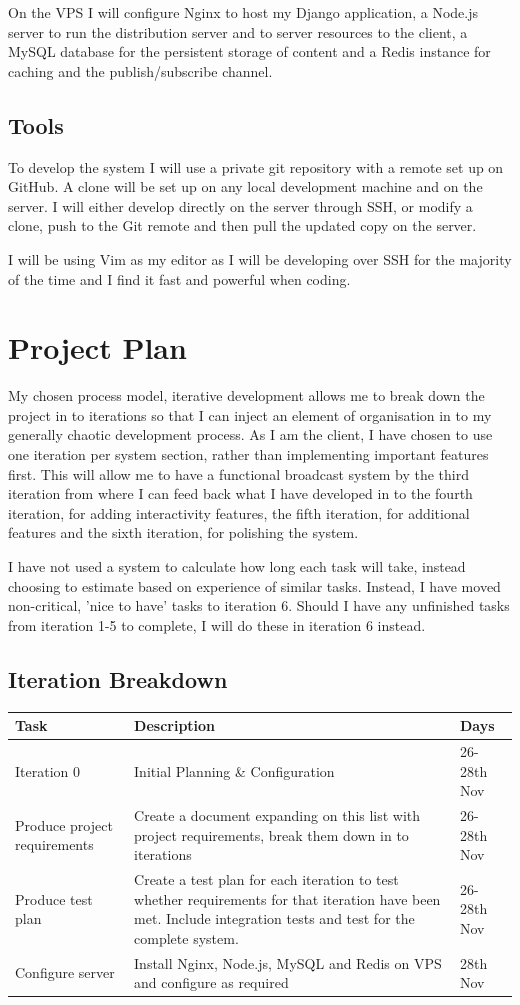 \documentclass[a4papert,11pt,notitlepage]{ltxdoc}
\begin{document}
On the VPS I will configure Nginx to host my Django application, a Node.js server to run the distribution server and to server resources to the client, a MySQL database for the persistent storage of content and a Redis instance for caching and the publish/subscribe channel.

\subsection{Tools}
To develop the system I will use a private git repository with a remote set up on GitHub. A clone will be set up on any local development machine and on the server. I will either develop directly on the server through SSH, or modify a clone, push to the Git remote and then pull the updated copy on the server.

I will be using Vim as my editor as I will be developing over SSH for the majority of the time and I find it fast and powerful when coding.

\section{Project Plan}
My chosen process model, iterative development allows me to break down the project in to iterations so that I can inject an element of organisation in to my generally chaotic development process. As I am the client, I have chosen to use one iteration per system section, rather than implementing important features first. This will allow me to have a functional broadcast system by the third iteration from where I can feed back what I have developed in to the fourth iteration, for adding interactivity features, the fifth iteration, for additional features and the sixth iteration, for polishing the system.

I have not used a system to calculate how long each task will take, instead choosing to estimate based on experience of similar tasks. Instead, I have moved non-critical, 'nice to have' tasks to iteration 6. Should I have any unfinished tasks from iteration 1-5 to complete, I will do these in iteration 6 instead.
 
\subsection{Iteration Breakdown}
\begin{tabular}{p{5cm} p{7cm} p{4cm}}
Task & Description & Days \\
\hline
Iteration 0 & Initial Planning \& Configuration & 26-28th Nov \\
\hline
Produce project requirements & Create a document expanding on this list with project requirements, break them down in to iterations & 26-28th Nov  \\
Produce test plan & Create a test plan for each iteration to test whether requirements for that iteration have been met. Include integration tests and test for the complete system. & 26-28th Nov \\
Configure server & Install Nginx, Node.js, MySQL and Redis on VPS and configure as required & 28th Nov \\
\end{tabular}
\end{document}

